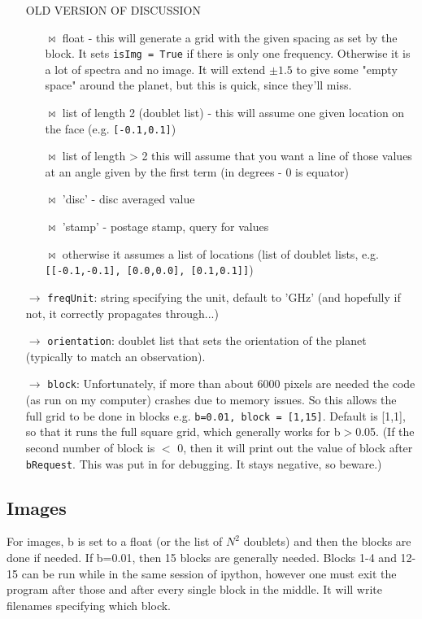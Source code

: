 \documentclass[11pt]{article}
\begin{document}
\begin{itemize}
OLD VERSION OF DISCUSSION
	\begin{itemize}
	\item[$\bowtie$] float - this will generate a grid with the given spacing as set by the block.  It sets \texttt{isImg = True} if there is only one frequency.  Otherwise it is a lot of spectra and no image.  It will extend $\pm 1.5$ to give some "empty space" around the planet, but this is quick, since they'll miss.
	\item[$\bowtie$] list of length 2 (doublet list) - this will assume one given location on the face (e.g. \texttt{[-0.1,0.1]})
	\item[$\bowtie$] list of length > 2  this will assume that you want a line of those values at an angle given by the first term (in degrees - 0 is equator)
	\item[$\bowtie$] 'disc' - disc averaged value
	\item[$\bowtie$] 'stamp' - postage stamp, query for values
	\item[$\bowtie$] otherwise it assumes a list of locations (list of doublet lists, e.g. \texttt{[[-0.1,-0.1], }\texttt{[0.0,0.0], }\texttt{[0.1,0.1]]})
	\end{itemize}
\item[$\rightarrow$]  \texttt{freqUnit}:  string specifying the unit, default to 'GHz' (and hopefully if not, it correctly propagates through...)
\item[$\rightarrow$]  \texttt{orientation}:  doublet list that sets the orientation of the planet (typically to match an observation).
\item[$\rightarrow$]  \texttt{block}:  Unfortunately, if more than about 6000 pixels are needed the code (as run on my computer) crashes due to memory issues.  So this allows the full grid to be done in blocks e.g. \texttt{b=0.01, block = [1,15]}.  Default is [1,1], so that it runs the full square grid, which generally works for b$>$0.05.  (If the second number of block is $<$ 0, then it
will print out the value of block after \texttt{bRequest}.  This was put in for debugging.  It stays negative, so beware.)
\end{itemize}

\subsection{Images}
For images, b is set to a float (or the list of $N^2$ doublets) and then the blocks are done if needed.  If b=0.01, then 15 blocks are generally needed.  Blocks 1-4 and 12-15 can be run while in the same session of ipython, however one must exit the program after those and after every single block in the middle.  It will write filenames specifying which block.
\end{document}
